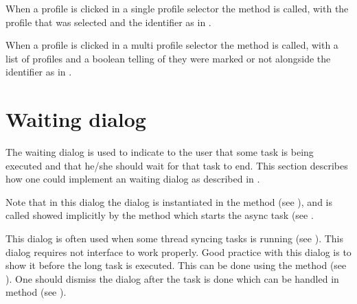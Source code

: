 

\noindent
When a profile is clicked in a single profile selector the  method is called, with the profile that was selected and the identifier  as in .



\noindent
When a profile is clicked in a multi profile selector the  method is called, with a list of profiles and a boolean telling of they were marked or not alongside the identifier  as in .

\section{Waiting dialog}
\label{sec:impl_waiting_dialog}

The waiting dialog is used to indicate to the user that some task is being executed and that he/she should wait for that task to end. This section describes how one could implement an waiting dialog as described in .

\begin{note}
    Note that in this dialog the dialog is instantiated in the  method (see ), and is called showed implicitly by the  method which starts the async task (see .
\end{note}

\noindent
This dialog is often used when some thread syncing tasks is running (see ). This dialog requires not interface to work properly. Good practice with this dialog is to show it before the long task is executed. This can be done using the  method (see ). One should dismiss the dialog after the task is done which can be handled in  method (see ).

